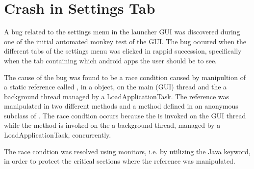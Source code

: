 
\section{Crash in Settings Tab}
\label{sec:crash_in_settings_tab}

A bug related to the settings menu in the launcher GUI was discovered during one of the initial automated monkey test of the GUI. The bug occured when the different tabs of the settings menu was clicked in rappid succession, specifically when the tab containing which android apps the user should be to see.

The cause of the bug was found to be a race condition caused by manipultion of a static reference called , in a  object, on the main (GUI) thread and the a background thread managed by a LoadApplicationTask. The reference was manipulated in two different methods  and a method  defined in an anonymous subclass of . The race condtion occurs because the  is invoked on the GUI thread while the  method is invoked on the a background thread, managed by a LoadApplicationTask, concurrently.   

The race condtion was resolved using monitors, i.e. by utilizing the  Java keyword, in order to protect the critical sections where the  reference was manipulated.



